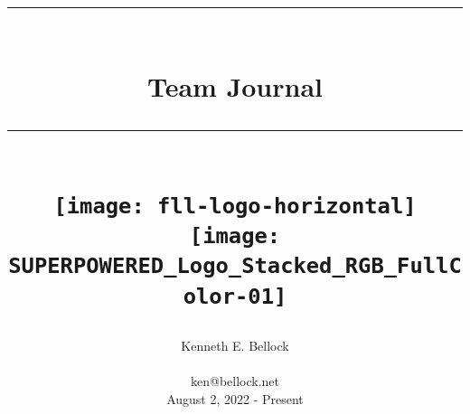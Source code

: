 \documentclass[index=totoc,hyperref, openany]{labbook} %
\date{} %
\newcommand{\HRule}{\rule{\linewidth}{0.5mm}} %
\begin{document}
 

\frontmatter
\title{
	\begin{center}
	  \HRule \\[0.4cm]
	  { \Huge \bfseries Team Journal}\\[0.4cm]
	  \HRule \\[1.5cm]
                  \texttt{[image: fll-logo-horizontal]}
                  \texttt{[image: SUPERPOWERED\_Logo\_Stacked\_RGB\_FullColor-01]}
	\end{center}
}
\author{\Huge Kenneth E. Bellock \\ \\ \LARGE ken@bellock.net \\[1.5cm] August 2, 2022 - Present\\[1.5cm]}
\maketitle

\printindex
\printglossaries
\glsaddall
\tableofcontents

\mainmatter



\end{document}

